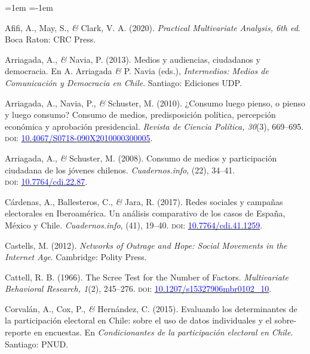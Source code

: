 \documentclass[a4paper]{tufte-handout}
\begin{document}
\begin{list}{}%
{\leftmargin=1em \itemindent=-1em}

\item{\small Afifi, A., May, S., {\itshape \&} Clark, V. A. (2020). {\itshape Practical Multivariate Analysis, 6th ed}. Boca Raton: CRC Press.}

\item{\small Arriagada, A., {\itshape \&} Navia, P. (2013). Medios y audiencias, ciudadanos y democracia. En A. Arriagada {\itshape \&} P. Navia (eds.), {\itshape Intermedios: Medios de Comunicación y Democracia en Chile}. Santiago: Ediciones UDP.}

\item{\small Arriagada, A., Navia, P., {\itshape \&} Schuster, M. (2010). ¿Consumo luego pienso, o pienso y luego consumo? Consumo de medios, predisposición política, percepción económica y aprobación presidencial. {\itshape Revista de Ciencia Política, 30}(3), 669--695. {\scshape doi:} \href{http://dx.doi.org/10.4067/S0718-090X2010000300005}{\textcolor{blue}{10.4067/S0718-090X2010000300005}}.}

\item{\small Arriagada, A., {\itshape \&} Schuster, M. (2008). Consumo de medios y participación ciudadana de los jóvenes chilenos. {\itshape Cuadernos.info}, (22), 34--41. \\ {\scshape doi:} \href{https://doi.org/10.7764/cdi.22.87}{\textcolor{blue}{10.7764/cdi.22.87}}.}

\item{\small Cárdenas, A., Ballesteros, C., {\itshape \&} Jara, R. (2017). Redes sociales y campañas electorales en Iberoamérica. Un análisis comparativo de los casos de España, México y Chile. {\itshape Cuadernos.info}, (41), 19--40. {\scshape doi:} \href{https://doi.org/10.7764/cdi.41.1259}{\textcolor{blue}{10.7764/cdi.41.1259}}.}

\item{\small Castells, M. (2012). {\itshape Networks of Outrage and Hope: Social Movements in the Internet Age}. Cambridge: Polity Press.}

\item{\small Cattell, R. B. (1966). The Scree Test for the Number of Factors. {\itshape Multivariate Behavioral Research, 1}(2), 245--276. {\scshape doi:} \href{https://doi.org/10.1207/s15327906mbr0102_10}{\textcolor{blue}{10.1207/s15327906mbr0102\_10}}.}

\item{\small Corvalán, A., Cox, P., {\itshape \&} Hernández, C. (2015). Evaluando los determinantes de la participación electoral en Chile: sobre el uso de datos individuales y el sobre-reporte en encuestas. En {\itshape Condicionantes de la participación electoral en Chile}. Santiago: PNUD.}


\end{list}
\end{document}
